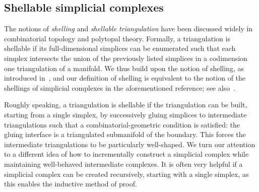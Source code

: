 \documentclass[10pt,letterpaper]{article}
\begin{document}
% 
% 







\subsection{Shellable simplicial complexes}


The notions of \emph{shelling} and \emph{shellable triangulation} have been discussed widely in combinatorial topology and polytopal theory. 
Formally, a triangulation is shellable if its full-dimensional simplices can be enumerated such that each simplex intersects the union of the previously listed simplices in a codimension one triangulation of a manifold. 
We thus build upon the notion of shelling, as introduced in~\cite[Definition 8.1]{ziegler2012lectures},
and our definition of shelling is equivalent to the notion of the shellings of simplicial complexes in the aforementioned reference; see also~\cite[Remark~8.3]{ziegler2012lectures}. 

Roughly speaking, a triangulation is shellable if the triangulation can be built, starting from a single simplex,
by successively gluing simplices to intermediate triangulations such that a combinatorial-geometric condition is satisfied:
the gluing interface is a triangulated submanifold of the boundary. 
This forces the intermediate triangulations to be particularly well-shaped. 
We turn our attention to a different idea of how to incrementally construct a simplicial complex while maintaining well-behaved intermediate complexes. 
It is often very helpful if a simplicial complex can be created recursively, starting with a single simplex, 
as this enables the inductive method of proof.
\\
\end{document}
